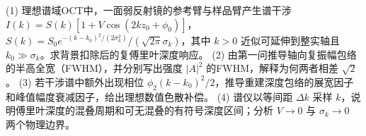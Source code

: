 (1) 理想谱域OCT中，一面弱反射镜的参考臂与样品臂产生谱干涉 \(I(k)=S(k)[1+V\cos(2kz_0+\phi_0)]\)，\(S(k)=S_0e^{-(k-k_0)^2/(2\sigma_k^2)}/(\sqrt{2\pi}\sigma_k)\)，其中 \(k>0\) 近似可延伸到整实轴且 \(k_0\gg\sigma_k\)。求背景扣除后的复傅里叶深度响应。
(2) 由第一问推导轴向复振幅包络的半高全宽（FWHM），并分别写出强度 \(|A|^2\) 的FWHM，解释为何两者相差 \(\sqrt2\)。
(3) 若干涉谱中额外出现相位 \(\phi_2(k-k_0)^2/2\)，推导重建深度包络的展宽因子和峰值幅度衰减因子，给出理想数值色散补偿。
(4) 谱仪以等间距 \(\Delta k\) 采样 \(k\)，说明傅里叶深度的混叠周期和可无混叠的有符号深度区间；分析 \(V\to0\) 与 \(\sigma_k\to0\) 两个物理边界。
